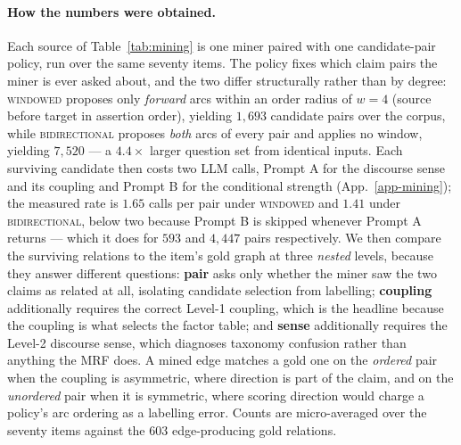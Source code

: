 \paragraph{How the numbers were obtained.} Each source of Table~\ref{tab:mining} is one miner paired with one
candidate-pair policy, run over the same seventy items. The policy fixes which claim pairs the miner is ever
asked about, and the two differ structurally rather than by degree: \textsc{windowed} proposes only
\emph{forward} arcs within an order radius of $w=4$ (source before target in assertion order), yielding $1{,}693$
candidate pairs over the corpus, while \textsc{bidirectional} proposes \emph{both} arcs of every pair and applies
no window, yielding $7{,}520$ --- a $4.4\times$ larger question set from identical inputs. Each surviving
candidate then costs two LLM calls, Prompt A for the discourse sense and its coupling and Prompt B for the
conditional strength (App.~\ref{app-mining}); the measured rate is $1.65$ calls per pair under \textsc{windowed}
and $1.41$ under \textsc{bidirectional}, below two because Prompt B is skipped whenever Prompt A returns
 --- which it does for $593$ and $4{,}447$ pairs respectively. We then compare the surviving
relations to the item's gold graph at three \emph{nested} levels, because they answer different questions:
\textbf{pair} asks only whether the miner saw the two claims as related at all, isolating candidate selection
from labelling; \textbf{coupling} additionally requires the correct Level-1 coupling, which is the headline
because the coupling is what selects the factor table; and \textbf{sense} additionally requires the Level-2
discourse sense, which diagnoses taxonomy confusion rather than anything the MRF does. A mined edge matches a
gold one on the \emph{ordered} pair when the coupling is asymmetric, where direction is part of the claim, and on
the \emph{unordered} pair when it is symmetric, where scoring direction would charge a policy's arc ordering as a
labelling error. Counts are micro-averaged over the seventy items against the $603$ edge-producing gold
relations.

